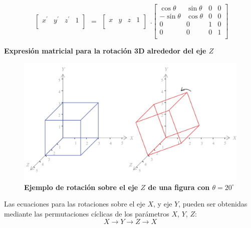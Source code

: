 \begin{equation}
\begin{array}{rccl}
\left[
\begin{array}{rccl}
{x}^{\prime} & {y}^{\prime} & {z}^{\prime} & 1\\
\end{array}
\right]
\end{array}
=
\begin{array}{rccl}
\left[
\begin{array}{rccl}
x & y & z & 1\\
\end{array}
\right]
\end{array} 
.
\left[
\begin{array}{rccl}
\cos\theta & \sin\theta & 0 & 0\\
-\sin\theta & \cos\theta & 0 & 0\\
0 & 0 & 1 & 0\\
0 & 0 & 0 & 1\\
\end{array}
\right]
\end{equation}

\begin{center}
\textbf{\footnotesize{Expresión matricial para la rotación 3D alrededor del eje $Z$}}
\end{center}

\begin{figure}[h]
\includegraphics[width=12cm]{Img/GEO/geo-rotacion3d0.jpg}
\centering
    \caption{\footnotesize{\textbf{Ejemplo de rotación sobre el eje $Z$ de una figura con $\theta = 20^{\circ}$}}}
\end{figure}

Las ecuaciones para las rotaciones sobre el eje $X$, y eje $Y$, pueden ser obtenidas mediante las permutaciones cíclicas de los parámetros $X$, $Y$, $Z$: 
$$X \xrightarrow \ Y \xrightarrow \ Z \xrightarrow \ X$$


